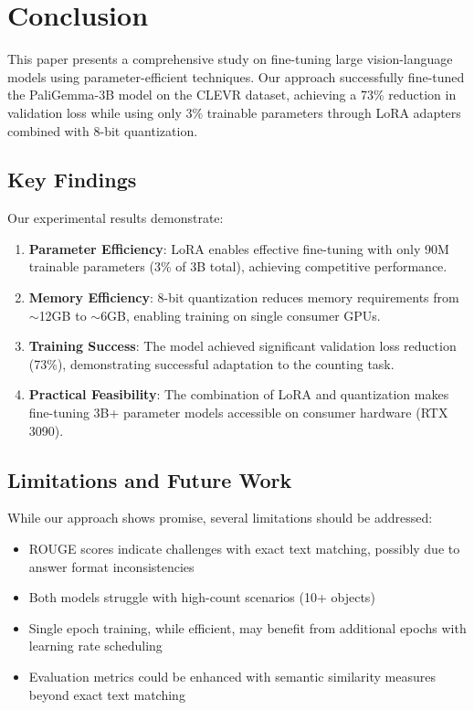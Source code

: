 \documentclass[conference]{IEEEtran}
\begin{document}
\section{Conclusion}

This paper presents a comprehensive study on fine-tuning large vision-language models using parameter-efficient techniques. Our approach successfully fine-tuned the PaliGemma-3B model on the CLEVR dataset, achieving a 73\% reduction in validation loss while using only 3\% trainable parameters through LoRA adapters combined with 8-bit quantization.

\subsection{Key Findings}

Our experimental results demonstrate:

\begin{enumerate}
    \item \textbf{Parameter Efficiency}: LoRA enables effective fine-tuning with only 90M trainable parameters (3\% of 3B total), achieving competitive performance.
    
    \item \textbf{Memory Efficiency}: 8-bit quantization reduces memory requirements from $\sim$12GB to $\sim$6GB, enabling training on single consumer GPUs.
    
    \item \textbf{Training Success}: The model achieved significant validation loss reduction (73\%), demonstrating successful adaptation to the counting task.
    
    \item \textbf{Practical Feasibility}: The combination of LoRA and quantization makes fine-tuning 3B+ parameter models accessible on consumer hardware (RTX 3090).
\end{enumerate}

\subsection{Limitations and Future Work}

While our approach shows promise, several limitations should be addressed:

\begin{itemize}
    \item ROUGE scores indicate challenges with exact text matching, possibly due to answer format inconsistencies
    \item Both models struggle with high-count scenarios (10+ objects)
    \item Single epoch training, while efficient, may benefit from additional epochs with learning rate scheduling
    \item Evaluation metrics could be enhanced with semantic similarity measures beyond exact text matching
\end{itemize}
\end{document}
